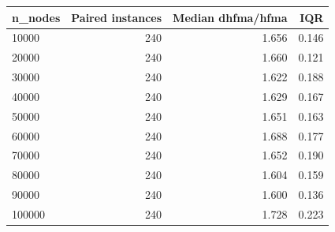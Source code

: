\begin{tabular}{lrrr}
\toprule
n\_nodes & Paired instances & Median dhfma/hfma & IQR \\
\midrule
10000 & 240 & 1.656 & 0.146 \\
20000 & 240 & 1.660 & 0.121 \\
30000 & 240 & 1.622 & 0.188 \\
40000 & 240 & 1.629 & 0.167 \\
50000 & 240 & 1.651 & 0.163 \\
60000 & 240 & 1.688 & 0.177 \\
70000 & 240 & 1.652 & 0.190 \\
80000 & 240 & 1.604 & 0.159 \\
90000 & 240 & 1.600 & 0.136 \\
100000 & 240 & 1.728 & 0.223 \\
\bottomrule
\end{tabular}
